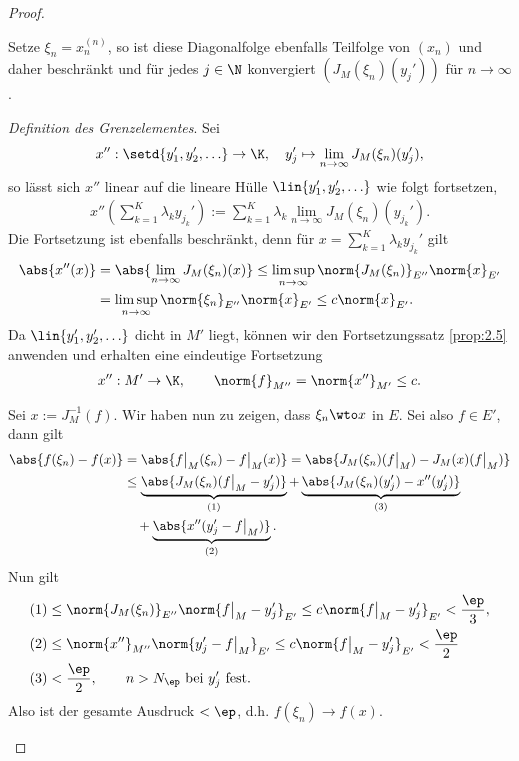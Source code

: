 \begin{proof}
\begin{proofenum}
Setze $\xi_n=x_n^{(n)}$, so ist diese Diagonalfolge
ebenfalls Teilfolge von $(x_n)$ und daher beschränkt und für jedes $j\in\N$ konvergiert
$(J_M(\xi_n)(y_j'))$ für $n\to\infty$.
\item \textit{Definition des Grenzelementes}. Sei
\begin{align*}
x'' : \setd{y_1',y_2',\ldots} \to \K,\quad y_j' \mapsto
\lim\limits_{n\to\infty} J_M(\xi_n)(y_j'),
\end{align*}
so lässt sich $x''$ linear auf die lineare Hülle $\lin{y_1',y_2',\ldots}$ wie
folgt fortsetzen,
\begin{align*}
x''\left(\sum\limits_{k=1}^K \lambda_k y_{j_k}'\right)
:= \sum\limits_{k=1}^K \lambda_k\lim\limits_{n\to\infty} J_M(\xi_n)(y_{j_k}').
\end{align*}
Die Fortsetzung ist ebenfalls beschränkt, denn für $x=\sum_{k=1}^K \lambda_k
y_{j_k}'$ gilt
\begin{align*}
\abs{x''(x)} &= 
\abs{\lim\limits_{n\to\infty} J_M(\xi_n)(x)}
\le \limsup\limits_{n\to\infty} \norm{J_M(\xi_n)}_{E''}\norm{x}_{E'}\\
&= \limsup\limits_{n\to\infty} \norm{\xi_n}_{E''}\norm{x}_{E'}
\le c\norm{x}_{E'}.
\end{align*}
Da $\lin{y_1',y_2',\ldots}$ dicht in $M'$ liegt, können wir den
Fortsetzungssatz \ref{prop:2.5} anwenden und erhalten eine eindeutige
Fortsetzung
\begin{align*}
x'': M'\to \K,\qquad \norm{f}_{M''} = \norm{x''}_{M'} \le c.
\end{align*}
\item Sei $x:=J_M^{-1}(f)$. Wir haben nun zu zeigen, dass $\xi_n\wto x$ in $E$.
Sei also $f\in E'$, dann gilt
\begin{align*}
\abs{f(\xi_n)-f(x)} &= \abs{f\big|_M(\xi_n)-f\big|_M(x)} =
\abs{J_M(\xi_n)(f\big|_M) - J_M(x)(f\big|_M)} \\ &\le
\underbrace{\abs{J_M(\xi_n)(f\big|_M-y_j')}}_{\text{(1)}} +
\underbrace{\abs{J_M(\xi_n)(y_j')-x''(y_j')}}_{\text{(3)}} \\
&\quad+
\underbrace{\abs{x''(y_j'-f\big|_M)}}_{\text{(2)}}.
\end{align*}
Nun gilt
\begin{align*}
&(1) \le \norm{J_M(\xi_n)}_{E''}\norm{f\big|_M-y_j'}_{E'}
\le c\norm{f\big|_M-y_j'}_{E'} < \frac{\ep}{3},\\
&(2) \le \norm{x''}_{M''}\norm{y_j'-f\big|_M}_{E'} \le
c\norm{f\big|_M-y_j'}_{E'} < \frac{\ep}{2}\\
&(3) < \frac{\ep}{2},\qquad n> N_\ep\text{ bei } y_j' \text{ fest}.
\end{align*}
Also ist der gesamte Ausdruck $< \ep$, d.h. $f(\xi_n)\to f(x)$.\qedhere
\end{proofenum}
\end{proof}

